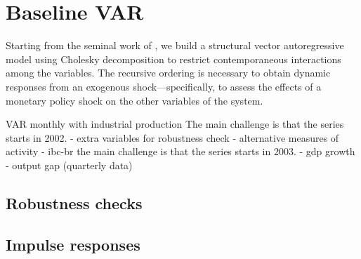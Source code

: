\section{Baseline VAR}
    Starting from the seminal work of \citet{Sims1992}, we build a structural vector autoregressive model using Cholesky decomposition to restrict contemporaneous interactions among the variables. The recursive ordering is necessary to obtain dynamic responses from an exogenous shock---specifically, to assess the effects of a monetary policy shock on the other variables of the system.

VAR monthly with industrial production
The main challenge is that the series starts in 2002.
    - extra variables for robustness check
    - alternative measures of activity
        - ibc-br
            the main challenge is that the series starts in 2003.
        - gdp growth
        - output gap (quarterly data)

    
    
    
    \subsection{Robustness checks}
    \subsection{Impulse responses}
        \lipsum[1]
